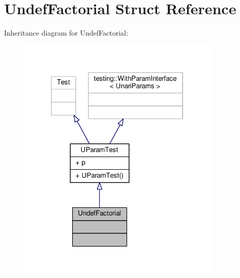\hypertarget{struct_undef_factorial}{}\section{Undef\+Factorial Struct Reference}
\label{struct_undef_factorial}


Inheritance diagram for Undef\+Factorial\+:
\nopagebreak
\begin{figure}[H]
\begin{center}
\leavevmode
\includegraphics[width=274pt]{struct_undef_factorial__inherit__graph}
\end{center}
\end{figure}


